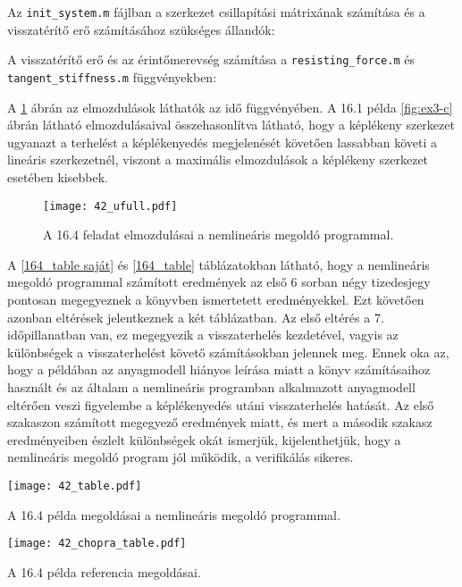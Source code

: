 Az \verb|init_system.m| fájlban a szerkezet csillapítási mátrixának számítása és a visszatérítő erő számításához szükséges állandók: 




A visszatérítő erő és az érintőmerevség számítása a \verb|resisting_force.m| és \verb|tangent_stiffness.m| függvényekben:




A \ref{fig:ize} ábrán az elmozdulások láthatók az idő függvényében. A   16.1 példa \ref{fig:ex3-c} ábrán látható elmozdulásaival összehasonlítva látható, hogy a képlékeny szerkezet ugyanazt  a terhelést a képlékenyedés megjelenését követően lassabban követi a lineáris szerkezetnél, viszont a maximális elmozdulások a képlékeny szerkezet esetében kisebbek. 

 
\begin{figure}[h!]
\centering
\texttt{[image: 42\_ufull.pdf]}
\caption[A \cite{chopra} 16.4 feladat elmozdulásai a nemlineáris megoldó programmal.]{A \cite{chopra} 16.4 feladat elmozdulásai a nemlineáris megoldó programmal.}
\label{fig:ize}
\end{figure}


A \ref{164_table saját} és \ref{164_table} táblázatokban látható, hogy a nemlineáris megoldó programmal számított eredmények az első 6 sorban  négy tizedesjegy pontosan megegyeznek a könyvben ismertetett eredményekkel. Ezt követően azonban eltérések jelentkeznek a két táblázatban. Az első eltérés a 7. időpillanatban van, ez megegyezik a visszaterhelés kezdetével, vagyis  az különbségek a visszaterhelést követő számításokban jelennek meg. Ennek oka  az, hogy a példában az anyagmodell  hiányos leírása miatt  a könyv számításaihoz használt és az általam a nemlineáris programban alkalmazott anyagmodell eltérően veszi figyelembe a képlékenyedés utáni visszaterhelés hatását. Az első szakaszon számított megegyező eredmények miatt, és mert a második szakasz eredményeiben észlelt különbségek okát ismerjük, kijelenthetjük, hogy a nemlineáris megoldó program jól működik, a verifikálás sikeres.

\begin{table}[p]
\centering
\texttt{[image: 42\_table.pdf]}
\caption{A \cite{chopra} 16.4 példa megoldásai a nemlineáris megoldó programmal.}
\label{164_table saját}
\end{table}

\begin{table}[p]
\centering
\texttt{[image: 42\_chopra\_table.pdf]}
\caption{A \cite{chopra} 16.4 példa referencia  megoldásai.}
\label{164_table}
\end{table}

